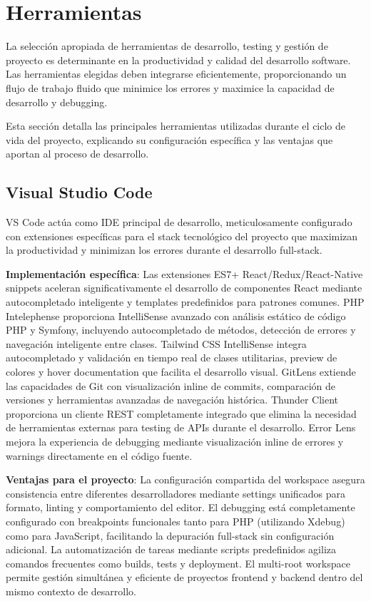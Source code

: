 \documentclass[12pt,a4paper,oneside]{report}
\begin{document}
\section{Herramientas}\label{herramientas}

La selección apropiada de herramientas de desarrollo, testing y gestión de proyecto es determinante en la productividad y calidad del desarrollo software. Las herramientas elegidas deben integrarse eficientemente, proporcionando un flujo de trabajo fluido que minimice los errores y maximice la capacidad de desarrollo y debugging.

Esta sección detalla las principales herramientas utilizadas durante el ciclo de vida del proyecto, explicando su configuración específica y las ventajas que aportan al proceso de desarrollo.

\subsection{Visual Studio Code}\label{visual-studio-code}

VS Code actúa como IDE principal de desarrollo, meticulosamente configurado con extensiones específicas para el stack tecnológico del proyecto que maximizan la productividad y minimizan los errores durante el desarrollo full-stack.

\textbf{Implementación específica}: Las extensiones ES7+ React/Redux/React-Native snippets aceleran significativamente el desarrollo de componentes React mediante autocompletado inteligente y templates predefinidos para patrones comunes. PHP Intelephense proporciona IntelliSense avanzado con análisis estático de código PHP y Symfony, incluyendo autocompletado de métodos, detección de errores y navegación inteligente entre clases. Tailwind CSS IntelliSense integra autocompletado y validación en tiempo real de clases utilitarias, preview de colores y hover documentation que facilita el desarrollo visual. GitLens extiende las capacidades de Git con visualización inline de commits, comparación de versiones y herramientas avanzadas de navegación histórica. Thunder Client proporciona un cliente REST completamente integrado que elimina la necesidad de herramientas externas para testing de APIs durante el desarrollo. Error Lens mejora la experiencia de debugging mediante visualización inline de errores y warnings directamente en el código fuente.

\textbf{Ventajas para el proyecto}: La configuración compartida del workspace asegura consistencia entre diferentes desarrolladores mediante settings unificados para formato, linting y comportamiento del editor. El debugging está completamente configurado con breakpoints funcionales tanto para PHP (utilizando Xdebug) como para JavaScript, facilitando la depuración full-stack sin configuración adicional. La automatización de tareas mediante scripts predefinidos agiliza comandos frecuentes como builds, tests y deployment. El multi-root workspace permite gestión simultánea y eficiente de proyectos frontend y backend dentro del mismo contexto de desarrollo.
\end{document}
